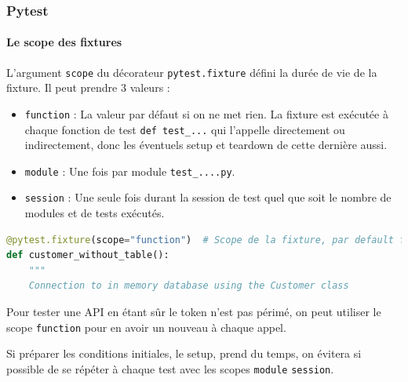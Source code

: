 \documentclass{beamer}
\begin{document}
    \begin{frame}[fragile]
        \frametitle{Pytest}
        \framesubtitle{Le scope des fixtures}
        \transdissolve
        L'argument \lstinline{scope} du décorateur \lstinline{pytest.fixture} défini la durée de vie
        de la fixture. Il peut prendre 3 valeurs :
        \begin{itemize}
            \item \lstinline{function} : La valeur par défaut si on ne met rien.
            La fixture est exécutée à chaque fonction de test \lstinline{def test_...} qui l'appelle directement ou indirectement, donc les éventuels setup et teardown de cette dernière aussi.
            \item \lstinline{module} : Une fois par module \lstinline{test_....py}.
            \item \lstinline{session} : Une seule fois durant la session de test quel que soit le nombre de modules et de tests exécutés.
        \end{itemize}
        \begin{lstlisting}[language=Python]
@pytest.fixture(scope="function")  # Scope de la fixture, par default function
def customer_without_table():
    """
    Connection to in memory database using the Customer class
        \end{lstlisting}

        Pour tester une API en étant sûr le token n'est pas périmé, on peut utiliser le scope \lstinline{function} pour en avoir un nouveau à chaque appel.

        Si préparer les conditions initiales, le setup, prend du temps, on évitera si possible de se répéter à chaque test avec les scopes \lstinline{module} \lstinline{session}.
    \end{frame}
\end{document}
